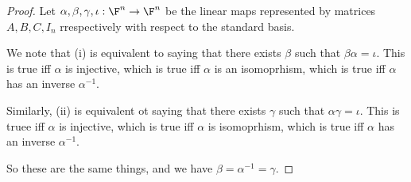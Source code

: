 \documentclass[a4paper]{article}
\begin{document}
\begin{proof}
  Let $\alpha, \beta, \gamma, \iota: \F^n \to \F^n$ be the linear maps represented by matrices $A, B, C, I_n$ rrespectively with respect to the standard basis.

  We note that (i) is equivalent to saying that there exists $\beta$ such that $\beta\alpha = \iota$. This is true iff $\alpha$ is injective, which is true iff $\alpha$ is an isomoprhism, which is true iff $\alpha$ has an inverse $\alpha^{-1}$.

  Similarly, (ii) is equivalent ot saying that there exists $\gamma$ such that $\alpha\gamma = \iota$. This is truee iff $\alpha$ is injective, which is true iff $\alpha$ is isomoprhism, which is true iff $\alpha$ has an inverse $\alpha^{-1}$.

  So these are the same things, and we have $\beta = \alpha^{-1} = \gamma$.
\end{proof}
\end{document}
